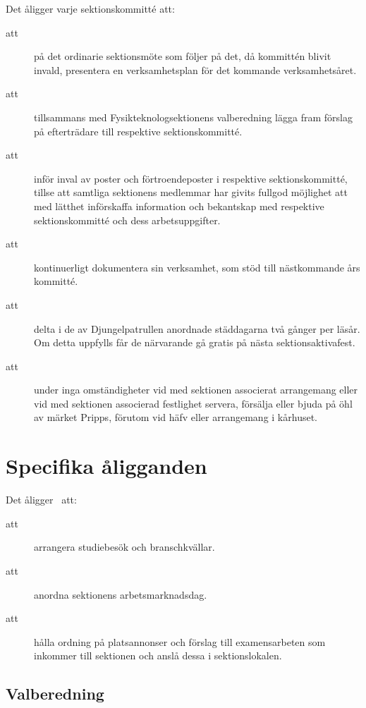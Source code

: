Det åligger varje sektionskommitté att:
\begin{description}
    \item[att] på det ordinarie sektionsmöte som följer på det, då kommittén blivit invald, presentera en verksamhetsplan för det kommande verksamhetsåret.
      \item[att] tillsammans med Fysikteknologsektionens valberedning lägga fram förslag på efterträdare till respektive sektionskommitté.
      \item[att] inför inval av poster och förtroendeposter i respektive sektionskommitté, tillse att samtliga sektionens medlemmar har givits fullgod möjlighet att med lätthet införskaffa information och bekantskap med respektive sektionskommitté och dess arbetsuppgifter.
      \item[att] kontinuerligt dokumentera sin verksamhet, som stöd till näst\-komm\-ande års kommitté.
      \item[att] delta i de av Djungelpatrullen anordnade städdagarna två gånger per
      läsår. Om detta uppfylls får de närvarande gå gratis på nästa
      sektionsaktivafest.
      \item[att] under inga omständigheter vid med sektionen associerat arrangemang eller vid med sektionen associerad festlighet servera, försälja eller bjuda på öhl av märket Pripps, förutom vid häfv eller arrangemang i kårhuset.
      
    \end{description}

\section{Specifika åligganden}
Det åligger \forening \ att:
\begin{description}
\item[att] arrangera studiebesök och branschkvällar.

\item[att] anordna sektionens arbetsmarknadsdag.

\item[att] hålla ordning på platsannonser och förslag till examensarbeten som inkommer till sektionen och anslå dessa i sektionslokalen.

\end{description}

\subsection{Valberedning}
